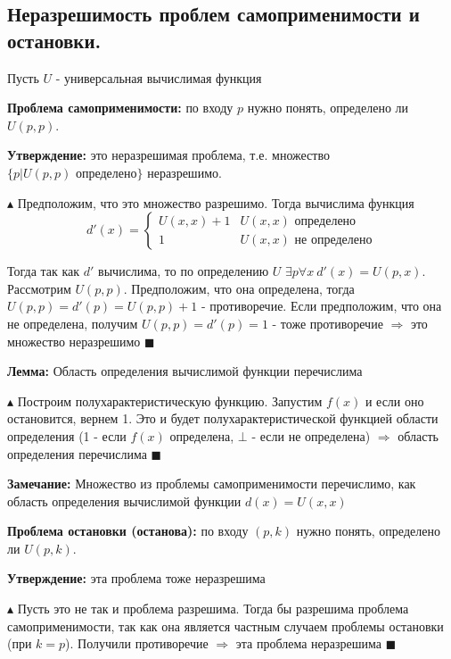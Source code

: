 \subsection{Неразрешимость проблем самоприменимости и остановки.}
\par Пусть $U$ - универсальная вычислимая функция
\par \textbf{Проблема самоприменимости:} по входу $p$ нужно понять, определено ли $U(p,p)$.
\par \textbf{Утверждение:} это неразрешимая проблема, т.е. множество $\{p|U(p,p) \text{ определено}\}$ неразрешимо.
\par $\blacktriangle$ Предположим, что это множество разрешимо. Тогда вычислима функция $$d'(x)=\begin{cases}
   U(x,x)+1 &\text{$U(x,x)$ определено}\\
   1 &\text{$U(x,x)$ не определено}
 \end{cases}$$
 \par Тогда так как $d'$ вычислима, то по определению $U$ $\exists p \forall x \: d'(x)=U(p, x)$. Рассмотрим $U(p,p)$. Предположим, что она определена, тогда $U(p,p)=d'(p)=U(p,p)+1$ - противоречие. Если предположим, что она не определена, получим $U(p,p)=d'(p)=1$ - тоже противоречие $\Rightarrow$ это множество неразрешимо $\blacksquare$
\par \textbf{Лемма:} Область определения вычислимой функции перечислима
\par $\blacktriangle$ Построим полухарактеристическую функцию. Запустим $f(x)$ и если оно остановится, вернем 1. Это и будет полухарактеристической функцией области определения (1 - если $f(x)$ определена, $\bot$ - если не определена) $\Rightarrow$ область определения перечислима $\blacksquare$
\par \textbf{Замечание:} Множество из проблемы самоприменимости перечислимо, как область определения вычислимой функции $d(x)=U(x,x)$
\par \textbf{Проблема остановки (останова):} по входу $(p,k)$ нужно понять, определено ли $U(p,k)$.
\par \textbf{Утверждение:} эта проблема тоже неразрешима
\par $\blacktriangle$ Пусть это не так и проблема разрешима. Тогда бы разрешима проблема самоприменимости, так как она является частным случаем проблемы остановки (при $k=p$). Получили противоречие $\Rightarrow$ эта проблема неразрешима $\blacksquare$

